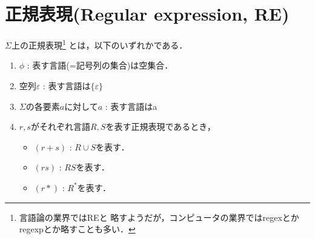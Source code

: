 \section{正規表現(Regular expression, RE)}
$\Sigma$上の正規表現\footnote{言語論の業界ではREと
 略すようだが，コンピュータの業界ではregexとかregexpとか略すことも多い．}
 とは，以下のいずれかである．
\begin{enumerate}
 \item $\phi$ : 表す言語(=記号列の集合)は空集合．
 \item 空列$\varepsilon$ : 表す言語は$\{\varepsilon\}$
 \item $\Sigma$の各要素$a$に対して$a$ : 表す言語は{a}
 \item $r, s$がそれぞれ言語$R, S$を表す正規表現であるとき，
       \begin{itemize}
        \item $(r+s)$ : $R\cup S$を表す．
        \item $(rs)$ : $RS$を表す．
        \item $(r*)$ : $R^{*}$を表す．
       \end{itemize}
\end{enumerate}
